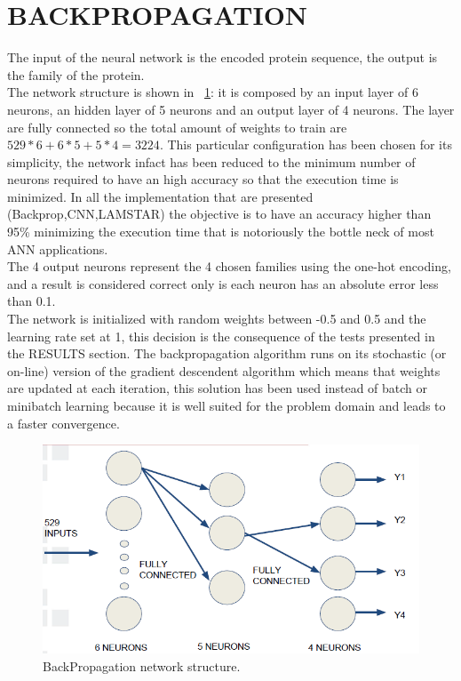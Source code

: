 \documentclass[a4paper, 10pt, conference]{ieeeconf}      %
\begin{document}
\section{BACKPROPAGATION}\label{sec:bp}
	The input of the neural network is the encoded protein sequence, the output is the family of the protein.\\
	The network structure is shown in ~\ref{bp}: it is composed by an input layer of 6 neurons, an hidden layer of 5 neurons and an output layer of 4 neurons. The layer are fully connected so the total amount of weights to train are $529*6 + 6*5 + 5*4=3224$. This particular configuration has been chosen for its simplicity, the network infact has been reduced to the minimum number of neurons required to have an high accuracy so that the execution time is minimized. In all the implementation that are presented (Backprop,CNN,LAMSTAR) the objective is to have an accuracy higher than 95\% minimizing the execution time that is notoriously the bottle neck of most ANN applications.\\
	The 4 output neurons represent the 4 chosen families using the one-hot encoding, and a result is considered correct only is each neuron has an absolute error less than 0.1.\\
	The network is initialized with random weights
	between -0.5 and 0.5 and the learning rate set at 1, this decision is the consequence of the tests presented in the RESULTS section. The backpropagation algorithm runs
	on its stochastic (or on-line) version of the gradient descendent algorithm which means
	that weights are updated at each iteration, this
	solution has been used instead of batch or minibatch
	learning because it is well suited for the
	problem domain and leads to a faster convergence.
	\begin{figure}[thpb]
		\centering
		\includegraphics[scale=0.5]{bp.png}
		\caption{BackPropagation network structure.}
		\label{bp}
	\end{figure}
\end{document}
